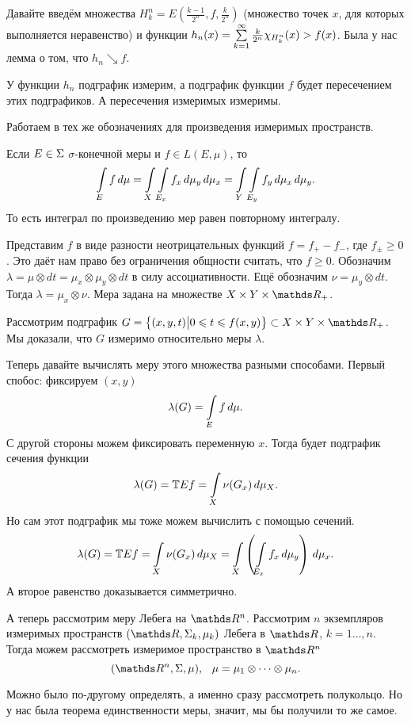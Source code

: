 \begin{Proof}
  Давайте введём множества $H_k^n = E\left(\frac{k-1}{2^{n}},f,\frac k{2^n}\right)$ (множество точек $x$, для которых выполняется неравенство) и функции $h_n(x) = \sum\limits_{k = 1}^{\infty} \frac k{2^n}\chi_{H_k^n}(x)> f(x)$. Была у нас лемма  о том, что $h_n\searrow f$.

У функции $h_n$ подграфик измерим, а подграфик функции $f$ будет пересечением этих подграфиков. А пересечения измеримых измеримы.
\end{Proof}

Работаем в тех же обозначениях для произведения измеримых пространств.
\begin{The}[Фубини]
  Если $E\in\Sigma$ $\sigma$-конечной меры и $f\in L(E,\mu)$, то 
   \[
  \int\limits_{E}f\,d\mu = \int\limits_{X}\int\limits_{E_x}f_x\,d\mu_y\,d\mu_x = \int\limits_{Y}\int\limits_{E_y}f_y\,d\mu_x\,d\mu_y.
\]
То есть интеграл по произведению мер равен повторному интегралу.
\end{The}

\begin{Proof}
  Представим $f$ в виде разности неотрицательных функций $f = f_+-f_-$, где $f_\pm\ge0$. Это даёт нам право без ограничения общности считать, что $f\ge 0$. Обозначим $\lambda = \mu\otimes dt = \mu_x\otimes \mu_y\otimes dt$ в силу ассоциативности. Ещё обозначим $\nu = \mu_y\otimes dt$. Тогда $\lambda = \mu_x\otimes \nu$. Мера задана на множестве $X\times Y\times \R_+$.

Рассмотрим подграфик $G = \big\{(x,y,t)\big|0\le t\le f(x,y)\big\}\subset X\times Y\times \R_+$. Мы доказали, что $G$ измеримо относительно меры $\lambda$.

Теперь давайте вычислять меру этого множества разными способами. Первый спобос: фиксируем $(x,y)$
\[
  \lambda(G) = \int\limits_{E}f\,d\mu.
\]
С другой стороны можем фиксировать переменную $x$. Тогда будет подграфик сечения функции
\[
  \lambda(G) = \mathbb{T} Ef = \int\limits_{X}\nu(G_x)\,d\mu_X.
\]
Но сам этот подграфик мы тоже можем вычислить с помощью сечений.
\[
\lambda(G) = \mathbb{T} Ef = \int\limits_{X}\nu(G_x)\,d\mu_X = \int\limits_{X}\left(\int\limits_{E_x}f_x\,d\mu_y\right)\,d\mu_x.
\]
А второе равенство доказывается симметрично.
\end{Proof}

А теперь рассмотрим меру Лебега на $\R^n$. Рассмотрим $n$ экземпляров измеримых пространств $(\R,\E_k,\mu_k)$ Лебега в $\R$, $k=1\dots,n$. Тогда можем рассмотреть измеримое пространство в $\R^n$
\[
  (\R^n,\E,\mu),\pau \mu = \mu_1\ods\mu_n.
\]

Можно было по-другому определять, а именно сразу рассмотреть полукольцо. Но у нас была теорема единственности меры, значит, мы бы получили то же самое.

